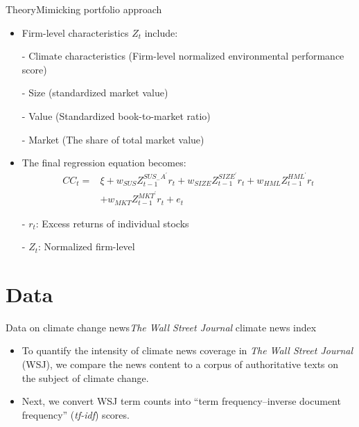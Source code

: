 \begin{frame}{Theory}{Mimicking portfolio approach}
	\begin{itemize}		
		\item Firm-level characteristics $Z_{t}$ include:
		\item [-] Climate characteristics (Firm-level normalized environmental performance score)
		\item [-] Size (standardized market value)
		\item [-] Value (Standardized book-to-market ratio)
		\item [-] Market (The share of total market value)
		\item The final regression equation becomes:
		$$
		\begin{aligned}
		C C_{t}=& \xi+w_{S U S} Z_{t-1}^{S U S_{-} A^{\prime}} r_{t}+w_{S I Z E} Z_{t-1}^{S I Z E^{\prime}} r_{t}+w_{H M L} Z_{t-1}^{H M L^{\prime}} r_{t} \\
		&+w_{M K T} Z_{t-1}^{M K T^{\prime}} r_{t}+e_{t}
		\end{aligned}
		$$
		\item [-] $r_{t}$: Excess returns of individual stocks
		\item [-]  $Z_{t}$: Normalized firm-level
	\end{itemize}	
\end{frame}

\section{Data}
\begin{frame}{Data on climate change news}{\textit{The Wall Street Journal} climate news index}
	\begin{itemize}		
		\item To quantify the intensity of climate news coverage in \textit{The Wall Street Journal} (WSJ), we compare the news content to a corpus of authoritative texts on the subject of climate change. 
		\item Next, we convert WSJ term counts into “term frequency–inverse document frequency” (\textit{tf-idf}) scores.
	\end{itemize}	
\end{frame}

